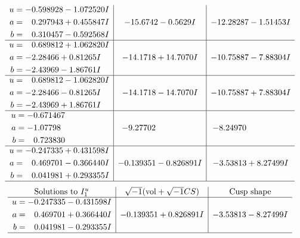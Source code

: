 \documentclass[1p]{elsarticle_modified}
\theoremstyle{definition}
\newcommand{\I}{\sqrt{-1}}
\begin{document}
$$\begin{array}{c|c|c}
\begin{aligned}
u &= -0.598928 - 1.072520 I \\
a &= \phantom{-}0.297943 + 0.455847 I \\
b &= \phantom{-}0.310457 - 0.592568 I\end{aligned}
 & -15.6742 - 0.5629 I & -12.28287 - 1.51453 I \\ \hline\begin{aligned}
u &= \phantom{-}0.689812 + 1.062820 I \\
a &= -2.28466 + 0.81265 I \\
b &= -2.43969 - 1.86761 I\end{aligned}
 & -14.1718 + 14.7070 I & -10.75887 - 7.88304 I \\ \hline\begin{aligned}
u &= \phantom{-}0.689812 - 1.062820 I \\
a &= -2.28466 - 0.81265 I \\
b &= -2.43969 + 1.86761 I\end{aligned}
 & -14.1718 - 14.7070 I & -10.75887 + 7.88304 I \\ \hline\begin{aligned}
u &= -0.671467\phantom{ +0.000000I} \\
a &= -1.07798\phantom{ +0.000000I} \\
b &= \phantom{-}0.723830\phantom{ +0.000000I}\end{aligned}
 & -9.27702\phantom{ +0.000000I} & -8.24970\phantom{ +0.000000I} \\ \hline\begin{aligned}
u &= -0.247335 + 0.431598 I \\
a &= \phantom{-}0.469701 - 0.366440 I \\
b &= \phantom{-}0.041981 + 0.293355 I\end{aligned}
 & -0.139351 - 0.826891 I & -3.53813 + 8.27499 I\\
 \hline 
 \end{array}$$\newpage$$\begin{array}{c|c|c}  
\text{Solutions to }I^u_{1}& \I (\text{vol} + \sqrt{-1}CS) & \text{Cusp shape}\\
 \hline 
\begin{aligned}
u &= -0.247335 - 0.431598 I \\
a &= \phantom{-}0.469701 + 0.366440 I \\
b &= \phantom{-}0.041981 - 0.293355 I\end{aligned}
 & -0.139351 + 0.826891 I & -3.53813 - 8.27499 I\\
 \hline 
 \end{array}$$\newpage\newpage\renewcommand{\arraystretch}{1}
\end{document}
